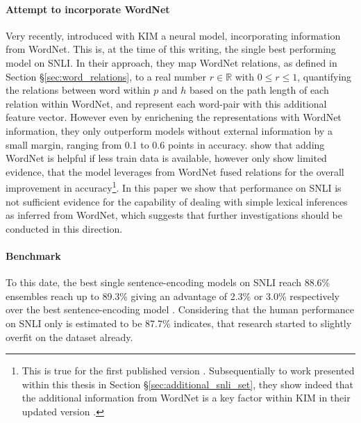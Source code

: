 \paragraph*{Attempt to incorporate WordNet}
Very recently, \cite{chen2017natural} introduced with \ac{KIM} a neural model, incorporating information from WordNet. This is, at the time of this writing,  the single best performing model on \ac{SNLI}. In their approach, they map WordNet relations, as defined in Section §\ref{sec:word_relations}, to a real number $r \in \mathbb{R}$ with $0 \leq r \leq 1$, quantifying the relations between word within $p$ and $h$ based on the path length of each relation within WordNet, and represent each word-pair with this additional feature vector. However even by enrichening the representations with WordNet information, they only outperform models without external information by a small margin, ranging from 0.1 to 0.6 points in accuracy. \cite{chen2017natural} show that adding WordNet is helpful if less train data is available, however only show limited evidence, that the model leverages from WordNet fused relations for the overall improvement in accuracy\footnote{This is true for the first published version \citep{chen2017natural}. Subsequentially to work presented within this thesis in Section §\ref{sec:additional_snli_set}, they show indeed that the additional information from WordNet is a key factor within \ac{KIM} in their updated version \citep{chen-EtAl:2017b:natural}.}. In this paper we show that performance on \ac{SNLI} is not sufficient evidence for the capability of dealing with simple lexical inferences as inferred from WordNet, which suggests that further investigations should be conducted in this direction.

\paragraph*{Benchmark}
To this date, the best single sentence-encoding models on \ac{SNLI} reach 88.6\% \citep{chen2017natural} ensembles reach up to 89.3\% \citep{tay2017compare,peters2018deep,ghaeini2018dr} giving an advantage of 2.3\% or 3.0\% respectively over the best sentence-encoding model \citep{im2017distance}. Considering that the human performance on \ac{SNLI} only is estimated to be 87.7\% \citep{gong2017natural} indicates, that research started to slightly overfit on the dataset already. 

